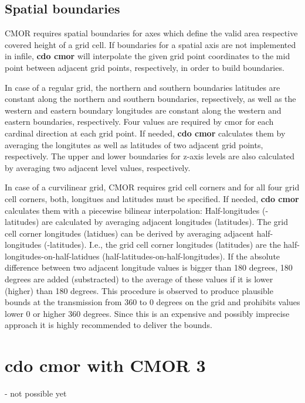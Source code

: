 \subsection{Spatial boundaries}

CMOR requires spatial boundaries for axes which define the valid area respective covered height of a grid cell. If boundaries for a spatial axis are not implemented in infile, \textbf{cdo cmor} will interpolate the given grid point coordinates to the mid point between adjacent grid points, respectively, in order to build boundaries.

In case of a regular grid, the northern and southern boundaries latitudes are constant along the northern and southern boundaries, repsectively, as well as the western and eastern boundary longitudes are constant along the western and eastern boundaries, respectively. Four values are required by cmor for each cardinal direction at each grid point. If needed, \textbf{cdo cmor} calculates them by averaging the longitutes as well as latitudes of two adjacent grid points, respectively. The upper and lower boundaries for z-axis levels are also calculated by averaging two adjacent level values, respectively.

In case of a curvilinear grid, CMOR requires grid cell corners and for all four grid cell corners, both, longitues and latitudes must be specified. If needed, \textbf{cdo cmor} calculates them with a piecewise bilinear interpolation: Half-longitudes (-latitudes) are calculated by averaging adjacent longitudes (latitudes). The grid cell corner longitudes (latidues) can be derived by averaging adjacent half-longitudes (-latitudes). I.e., the grid cell corner longitudes (latitudes) are the half-longitudes-on-half-latidues (half-latitudes-on-half-longitudes). If the absolute difference between two adjacent longitude values is bigger than 180 degrees, 180 degrees are added (substracted) to the average of these values if it is lower (higher) than 180 degrees. This procedure is observed to produce plausible bounds at the transmission from 360 to 0 degrees on the grid and prohibits values lower 0 or higher 360 degrees. Since this is an expensive and possibly imprecise approach it is highly recommended to deliver the bounds.

\section{\textbf{cdo cmor} with CMOR 3}
- not possible yet 